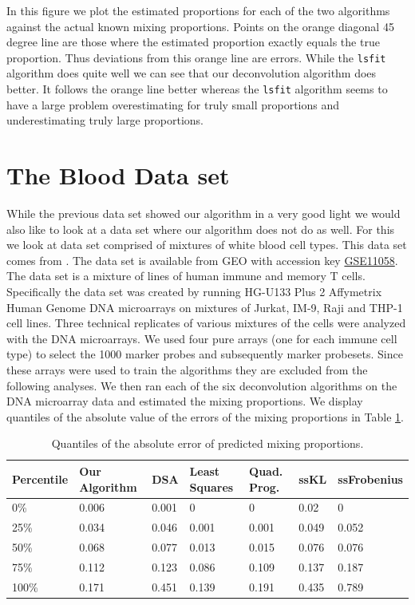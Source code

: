 \documentclass[reqno,12pt,oneside]{report}\usepackage[]{graphicx}\usepackage[]{color}
\theoremstyle{plain}
\theoremstyle{definition}
\theoremstyle{remark}
\numberwithin{theorem}{chapter}     %
\begin{document}
In this figure we plot the estimated proportions for each of the two algorithms against the actual known mixing proportions. Points on the orange diagonal 45 degree line are those where the estimated proportion exactly equals the true proportion. Thus deviations from this orange line are errors. While the \verb+lsfit+ algorithm does quite well we can see that our deconvolution algorithm does better. It follows the orange line better whereas the \verb+lsfit+ algorithm seems to have a large problem overestimating for truly small proportions and underestimating truly large proportions.   

\section{The Blood Data set}

While the previous data set showed our algorithm in a very good light we would also like to look at a data set where our algorithm does not do as well. For this we look at data set comprised of mixtures of white blood cell types. This data set comes from \cite{Abbas2009}. The data set is available from GEO with accession key \href{https://www.ncbi.nlm.nih.gov/geo/query/acc.cgi?acc=GSE11058}{GSE11058}. The data set is a mixture of lines of human immune and memory T cells. Specifically the data set was created by running HG-U133 Plus 2 Affymetrix Human Genome DNA microarrays on mixtures of Jurkat, IM-9, Raji and THP-1 cell lines. Three technical replicates of various mixtures of the cells were analyzed with the DNA microarrays. We used four pure arrays (one for each immune cell type) to select the 1000 marker probes and subsequently marker probesets. Since these arrays were used to train the algorithms they are excluded from the following analyses. We then ran each of the six deconvolution algorithms on the DNA microarray data and estimated the mixing proportions. We display quantiles of the absolute value of the errors of the mixing proportions in Table \ref{tab:blood}.

\begin{table}[ht]
\centering
\begin{tabular}{lllllll}
  \hline
Percentile & Our Algorithm & DSA & Least Squares & Quad. Prog. & ssKL & ssFrobenius \\ 
  \hline
0\% & 0.006 & 0.001 & 0 & 0 & 0.02 & 0 \\ 
  25\% & 0.034 & 0.046 & 0.001 & 0.001 & 0.049 & 0.052 \\ 
  50\% & 0.068 & 0.077 & 0.013 & 0.015 & 0.076 & 0.076 \\ 
  75\% & 0.112 & 0.123 & 0.086 & 0.109 & 0.137 & 0.187 \\ 
  100\% & 0.171 & 0.451 & 0.139 & 0.191 & 0.435 & 0.789 \\ 
   \hline
\end{tabular}
\caption{Quantiles of the absolute error of predicted mixing proportions.} 
\label{tab:blood}
\end{table}
\end{document}
